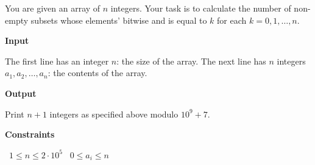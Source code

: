 You are given an array of $n$ integers. Your task is to calculate the number of non-empty subsets whose elements' bitwise and is equal to $k$ for each $k = 0, 1,\dots, n$.

\vspace{0.3cm}\noindent\textbf{Input}

The first line has an integer $n$: the size of the array.
The next line has $n$ integers $a_1, a_2,\dots, a_n$: the contents of the array.

\vspace{0.3cm}\noindent\textbf{Output}

Print $n + 1$ integers as specified above modulo $10^9 + 7$.

\vspace{0.3cm}\noindent\textbf{Constraints}

\textbullet\ $1 \le n \le 2 \cdot 10^5$
\textbullet\ $0 \le a_i \le n$